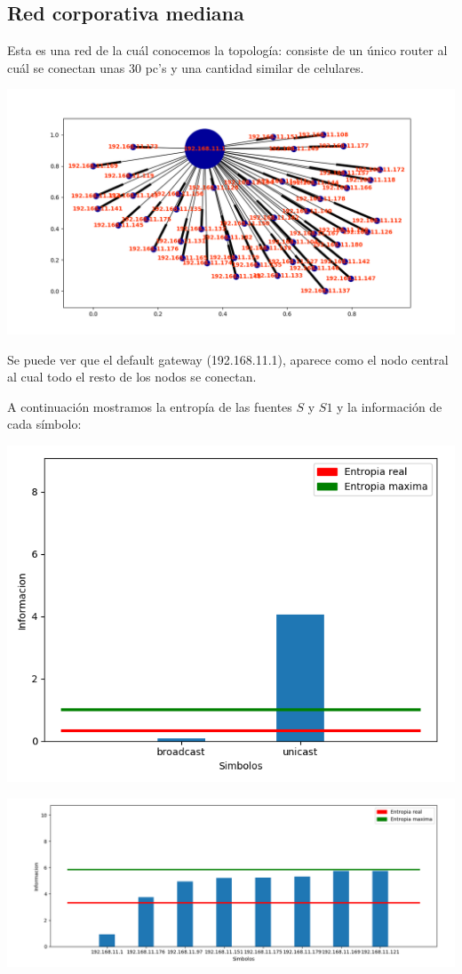 \subsection{Red corporativa mediana}

Esta es una red de la cuál conocemos la topología: consiste de un único router al cuál se conectan unas 30 pc's y una cantidad similar de celulares.


\includegraphics[scale=0.65]{imagenes/captura_red_trabajo_grafo.png}

Se puede ver que el default gateway (192.168.11.1), aparece como el nodo central al cual todo el resto de los nodos se conectan.

A continuación mostramos la entropía de las fuentes $S$ y $S1$ y la información de cada símbolo:

\includegraphics[scale=0.65]{imagenes/captura_red_trabajo_fuente_s.png}

\includegraphics[scale=0.65]{imagenes/captura_red_trabajo_fuente_s1.png}

